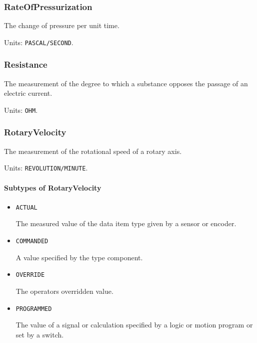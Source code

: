 \subsubsection{RateOfPressurization}
\label{sec:RateOfPressurization}



The change of pressure per unit time.


Units: \texttt{PASCAL/SECOND}.

\subsubsection{Resistance}
\label{sec:Resistance}



The measurement of the degree to which a substance opposes the passage of an electric current.


Units: \texttt{OHM}.

\subsubsection{RotaryVelocity}
\label{sec:RotaryVelocity}



The measurement of the rotational speed of a rotary axis.


Units: \texttt{REVOLUTION/MINUTE}.

\paragraph{Subtypes of RotaryVelocity}\mbox{}
\label{sec:Subtypes of RotaryVelocity}

\begin{itemize}

\item \texttt{ACTUAL}


The measured value of the data item type given by a sensor or encoder.

\item \texttt{COMMANDED}


A value specified by the  type component.

\item \texttt{OVERRIDE}


The operators overridden value.

\item \texttt{PROGRAMMED}


The value of a signal or calculation specified by a logic or motion program or set by a switch.


\end{itemize}


